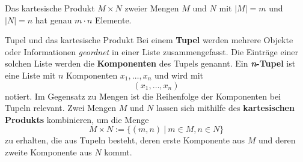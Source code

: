\documentclass[../../main.tex]{subfiles}
\begin{document}
\begin{theorem}{}
    Das kartesische Produkt $M\times N$ zweier Mengen $M$ und $N$ mit $|M|=m$ und $|N|=n$ hat genau $m\cdot n$ Elemente.
\end{theorem}

\begin{nutshell}{Tupel und das kartesische Produkt}
    Bei einem \textbf{Tupel} werden mehrere Objekte oder Informationen \emph{geordnet} in einer Liste zusammengefasst. Die Einträge einer solchen Liste werden die \textbf{Komponenten} des Tupels genannt. Ein \textbf{\emph{n}-Tupel} ist eine Liste mit $n$ Komponenten $x_1,\dots,x_n$ und wird mit \[(x_1,\dots,x_n)\] 
    notiert. Im Gegensatz zu Mengen ist die Reihenfolge der Komponenten bei Tupeln relevant. Zwei Mengen $M$ und $N$ lassen sich mithilfe des \textbf{kartesischen Produkts} kombinieren, um die Menge 
    \[M\times N:=\{(m,n)~|~m\in M, n\in N\}\]
    zu erhalten, die aus Tupeln besteht, deren erste Komponente aus $M$ und deren zweite Komponente aus $N$ kommt.
\end{nutshell}
\end{document}
